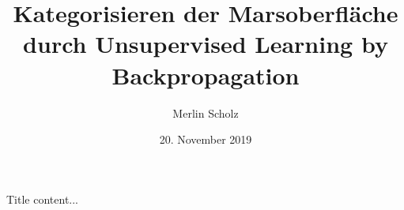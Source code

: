 \documentclass[aspectratio=169]{beamer}
\title[Analyse der Marsoberfläche durch Unsupervised Learning]{Kategorisieren der Marsoberfläche durch Unsupervised Learning by Backpropagation}
\author[Merlin Scholz]{Merlin Scholz}
\institute{TU Dortmund}
\date[20.11.2019]{20. November 2019}
\begin{document}
\frame{\titlepage}

\begin{frame}{Title}
	content...
\end{frame}
	
\end{document}
